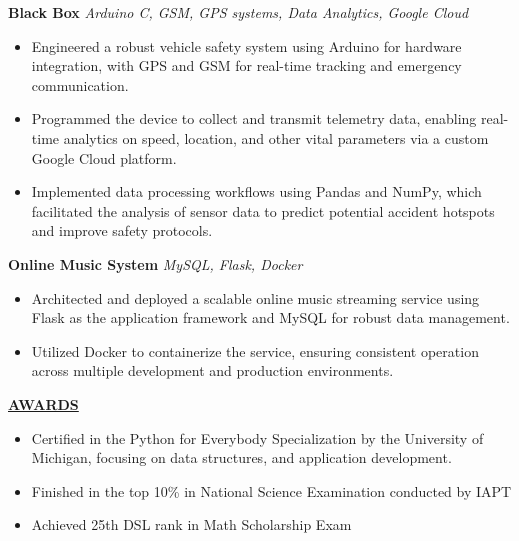 \documentclass{article}
\begin{document}
\noindent \textbf{Black Box} \textit{Arduino C, GSM, GPS systems, Data Analytics, Google Cloud} \hfill \textbf{}
\begin{itemize}[noitemsep,nolistsep,leftmargin=*]
\item {\small Engineered a robust vehicle safety system using Arduino for hardware integration, with GPS and GSM for real-time tracking and emergency communication.}
\item {\small Programmed the device to collect and transmit telemetry data, enabling real-time analytics on speed, location, and other vital parameters via a custom Google Cloud platform.}
\item {\small Implemented data processing workflows using Pandas and NumPy, which facilitated the analysis of sensor data to predict potential accident hotspots and improve safety protocols.}
\end{itemize}

\noindent \textbf{Online Music System} \textit{MySQL, Flask, Docker} \hfill \textbf{}
\begin{itemize}[noitemsep,nolistsep,leftmargin=*]
\item {\small Architected and deployed a scalable online music streaming service using Flask as the application framework and MySQL for robust data management.}
\item {\small Utilized Docker to containerize the service, ensuring consistent operation across multiple development and production environments.}\\
\end{itemize}

\noindent \textbf{\underline{AWARDS}} 
\begin{itemize}[noitemsep,nolistsep,leftmargin=*]
\item {\small Certified in the Python for Everybody Specialization by the University of Michigan, focusing on data structures, and application development.}
\item {\small Finished in the top 10\% in National Science Examination conducted by IAPT}
\item {\small Achieved 25th DSL rank in Math Scholarship Exam}
\end{itemize}



\end{document}
